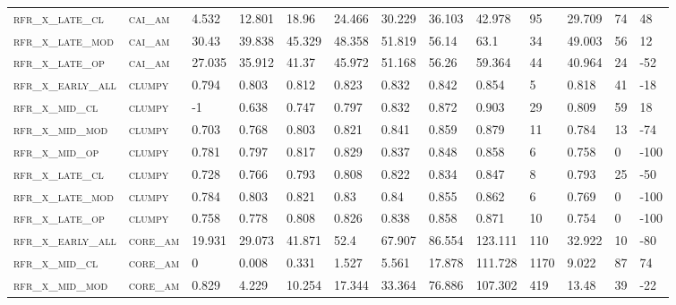 \begin{landscape}
\begin{center}
\begin{footnotesize}
\begin{longtable}{lllllllllllll}
\textsc{rfr\_x\_late\_cl  } & \textsc{cai\_am   }   & 4.532   & 12.801  & 18.96    & 24.466   & 30.229   & 36.103   & 42.978   & 95   & 29.709  & 74  & 48    \\
\textsc{rfr\_x\_late\_mod } & \textsc{cai\_am   }   & 30.43   & 39.838  & 45.329   & 48.358   & 51.819   & 56.14    & 63.1     & 34   & 49.003  & 56  & 12    \\
\textsc{rfr\_x\_late\_op  } & \textsc{cai\_am   }   & 27.035  & 35.912  & 41.37    & 45.972   & 51.168   & 56.26    & 59.364   & 44   & 40.964  & 24  & -52   \\
\textsc{rfr\_x\_early\_all} & \textsc{clumpy    }   & 0.794   & 0.803   & 0.812    & 0.823    & 0.832    & 0.842    & 0.854    & 5    & 0.818   & 41  & -18   \\
\textsc{rfr\_x\_mid\_cl   } & \textsc{clumpy    }   & -1      & 0.638   & 0.747    & 0.797    & 0.832    & 0.872    & 0.903    & 29   & 0.809   & 59  & 18    \\
\textsc{rfr\_x\_mid\_mod  } & \textsc{clumpy    }   & 0.703   & 0.768   & 0.803    & 0.821    & 0.841    & 0.859    & 0.879    & 11   & 0.784   & 13  & -74   \\
\textsc{rfr\_x\_mid\_op   } & \textsc{clumpy    }   & 0.781   & 0.797   & 0.817    & 0.829    & 0.837    & 0.848    & 0.858    & 6    & 0.758   & 0   & -100  \\
\textsc{rfr\_x\_late\_cl  } & \textsc{clumpy    }   & 0.728   & 0.766   & 0.793    & 0.808    & 0.822    & 0.834    & 0.847    & 8    & 0.793   & 25  & -50   \\
\textsc{rfr\_x\_late\_mod } & \textsc{clumpy    }   & 0.784   & 0.803   & 0.821    & 0.83     & 0.84     & 0.855    & 0.862    & 6    & 0.769   & 0   & -100  \\
\textsc{rfr\_x\_late\_op  } & \textsc{clumpy    }   & 0.758   & 0.778   & 0.808    & 0.826    & 0.838    & 0.858    & 0.871    & 10   & 0.754   & 0   & -100  \\
\textsc{rfr\_x\_early\_all} & \textsc{core\_am  }   & 19.931  & 29.073  & 41.871   & 52.4     & 67.907   & 86.554   & 123.111  & 110  & 32.922  & 10  & -80   \\
\textsc{rfr\_x\_mid\_cl   } & \textsc{core\_am  }   & 0       & 0.008   & 0.331    & 1.527    & 5.561    & 17.878   & 111.728  & 1170 & 9.022   & 87  & 74    \\
\textsc{rfr\_x\_mid\_mod  } & \textsc{core\_am  }   & 0.829   & 4.229   & 10.254   & 17.344   & 33.364   & 76.886   & 107.302  & 419  & 13.48   & 39  & -22   \\

\end{longtable}
\end{footnotesize}
\end{center}
\end{landscape}
